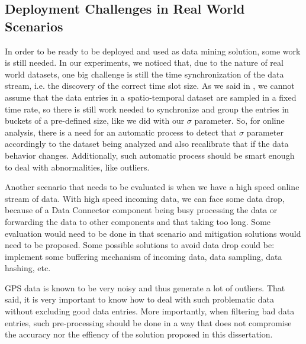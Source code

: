 \subsection{Deployment Challenges in Real World Scenarios}
In order to be ready to be deployed and used as data mining solution, some work is still needed. In our experiments, we
noticed that, due to the nature of real world datasets, one big challenge is still the time synchronization of the data
stream, i.e. the discovery of the correct time slot size. As we said in , we cannot assume
that the data entries in a spatio-temporal dataset are sampled in a fixed time rate, so there is still work needed to
synchronize and group the entries in buckets of a pre-defined size, like we did with our $\sigma$ parameter. So, for
online analysis, there is a need for an automatic process to detect that $\sigma$ parameter accordingly to the dataset
being analyzed and also recalibrate that if the data behavior changes. Additionally, such automatic process should be
smart enough to deal with abnormalities, like outliers.

Another scenario that needs to be evaluated is when we have a high speed online stream of data. With high speed incoming
data, we can face some data drop, because of a Data Connector component being busy processing the data or forwarding the
data to other components and that taking too long. Some evaluation would need to be done in that scenario and mitigation
solutions would need to be proposed. Some possible solutions to avoid data drop could be: implement some buffering
mechanism of incoming data, data sampling, data hashing, etc.

GPS data is known to be very noisy and thus generate a lot of outliers. That said, it is very important to know how to
deal with such problematic data without excluding good data entries. More importantly, when filtering bad data entries,
such pre-processing should be done in a way that does not compromise the accuracy nor the effiency of the solution
proposed in this dissertation.
